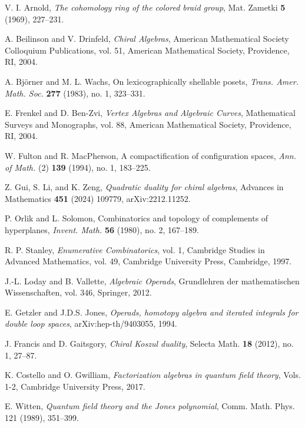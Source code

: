 \begin{thebibliography}{99}

V. I. Arnold, \emph{The cohomology ring of the colored braid group}, 
Mat. Zametki \textbf{5} (1969), 227--231.

 A. Beilinson and V. Drinfeld, \emph{Chiral Algebras}, American Mathematical Society Colloquium Publications, vol. 51, American Mathematical Society, Providence, RI, 2004.
 
 A. Björner and M. L. Wachs, On lexicographically shellable posets, \emph{Trans. Amer. Math. Soc.} \textbf{277} (1983), no. 1, 323--331.
 
 E. Frenkel and D. Ben-Zvi, \emph{Vertex Algebras and Algebraic Curves}, Mathematical Surveys and Monographs, vol. 88, American Mathematical Society, Providence, RI, 2004.
 
 W. Fulton and R. MacPherson, A compactification of configuration spaces, \emph{Ann. of Math.} (2) \textbf{139} (1994), no. 1, 183--225.
 
Z. Gui, S. Li, and K. Zeng, \emph{Quadratic duality for chiral algebras},
Advances in Mathematics \textbf{451} (2024) 109779, arXiv:2212.11252.
 
 P. Orlik and L. Solomon, Combinatorics and topology of complements of hyperplanes, \emph{Invent. Math.} \textbf{56} (1980), no. 2, 167--189.
 
 R. P. Stanley, \emph{Enumerative Combinatorics}, vol. 1, Cambridge Studies in Advanced Mathematics, vol. 49, Cambridge University Press, Cambridge, 1997.

 J.-L. Loday and B. Vallette, \emph{Algebraic Operads}, Grundlehren der mathematischen Wissenschaften, vol. 346, Springer, 2012.

 E. Getzler and J.D.S. Jones, \emph{Operads, homotopy algebra and iterated integrals for double loop spaces}, arXiv:hep-th/9403055, 1994.

 J. Francis and D. Gaitsgory, \emph{Chiral Koszul duality}, Selecta Math. \textbf{18} (2012), no. 1, 27--87.

 K. Costello and O. Gwilliam, \emph{Factorization algebras in quantum field theory}, Vols. 1-2, Cambridge University Press, 2017.

 E. Witten, \emph{Quantum field theory and the Jones polynomial}, 
  Comm. Math. Phys. 121 (1989), 351--399.


\end{thebibliography}
